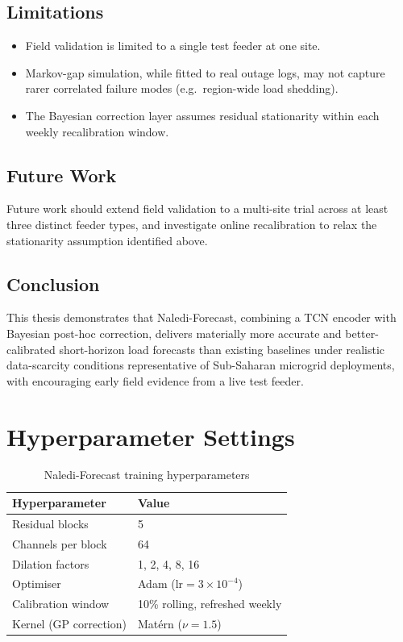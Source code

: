 \documentclass[12pt,a4paper]{report}
\begin{document}
\section{Limitations}
\begin{itemize}
  \item Field validation is limited to a single test feeder at one site.
  \item Markov-gap simulation, while fitted to real outage logs, may not capture rarer
        correlated failure modes (e.g.\ region-wide load shedding).
  \item The Bayesian correction layer assumes residual stationarity within each weekly
        recalibration window.
\end{itemize}

\section{Future Work}
Future work should extend field validation to a multi-site trial across at least three
distinct feeder types, and investigate online recalibration to relax the stationarity
assumption identified above.

\section{Conclusion}
This thesis demonstrates that Naledi-Forecast, combining a TCN encoder with Bayesian
post-hoc correction, delivers materially more accurate and better-calibrated short-horizon
load forecasts than existing baselines under realistic data-scarcity conditions
representative of Sub-Saharan microgrid deployments, with encouraging early field evidence
from a live test feeder.

\appendix
\chapter{Hyperparameter Settings}
\begin{table}[htbp]
\centering
\caption{Naledi-Forecast training hyperparameters}
\label{tab:hyperparams}
\begin{tabularx}{\linewidth}{@{}lX@{}}
\toprule
\textbf{Hyperparameter} & \textbf{Value} \\
\midrule
Residual blocks & 5 \\
Channels per block & 64 \\
Dilation factors & 1, 2, 4, 8, 16 \\
Optimiser & Adam ($\text{lr}=3\times10^{-4}$) \\
Calibration window & 10\% rolling, refreshed weekly \\
Kernel (GP correction) & Matérn ($\nu = 1.5$) \\
\bottomrule
\end{tabularx}
\end{table}
\end{document}
